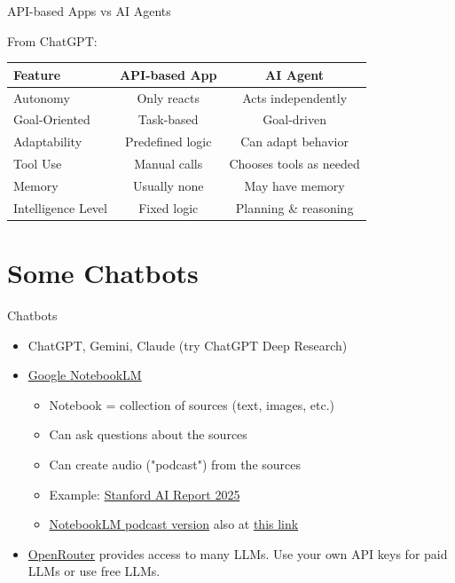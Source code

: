 \documentclass[10pt]{beamer}
\newcommand{\cmark}{\textcolor{green!70!black}{\ding{51}}} %
\newcommand{\xmark}{\textcolor{red}{\ding{55}}}             %
\begin{document}
   

    \begin{frame}{API-based Apps vs AI Agents}

        From ChatGPT:

        \begin{table}[h!]
        \centering
        \renewcommand{\arraystretch}{1.3}
        \begin{tabular}{|l|c|c|}
        \hline
        \textbf{Feature} & \textbf{API-based App} & \textbf{AI Agent} \\
        \hline
        Autonomy & \xmark{} Only reacts & \cmark{} Acts independently \\
        Goal-Oriented & \xmark{} Task-based & \cmark{} Goal-driven \\
        Adaptability & \xmark{} Predefined logic & \cmark{} Can adapt behavior \\
        Tool Use & \cmark{} Manual calls & \cmark{} Chooses tools as needed \\
        Memory & \xmark{} Usually none & \cmark{} May have memory \\
        Intelligence Level & \xmark{} Fixed logic & \cmark{} Planning \& reasoning \\
        \hline
        \end{tabular}
        \end{table}
        \end{frame}

\section{Some Chatbots}

\begin{frame}{Chatbots}
    \begin{itemize}
     \item ChatGPT, Gemini, Claude (try ChatGPT Deep Research)
    \item \href{https://notebooklm.google/}{Google NotebookLM}
    \begin{itemize}
        \item Notebook = collection of sources (text, images, etc.)
        \item Can ask questions about the sources
        \item Can create audio ("podcast") from the sources
    \item Example: \href{https://hai.stanford.edu/ai-index/2025-ai-index-report}{Stanford AI Report 2025}
    \item \href{https://notebooklm.google.com/notebook/83e22c17-71bf-4bb2-a803-294ffe11d365/audio}{NotebookLM podcast version} also at \href{https://mgmt675-2025.kerryback.com/assets/Stanford_AI_Report_2025.wav}{this link}
    \end{itemize}
    \item \href{https://openrouter.ai/}{OpenRouter} provides access to many LLMs.  Use your own API keys for paid LLMs or use free LLMs.
        \end{itemize}
    \end{frame}
\end{document}
